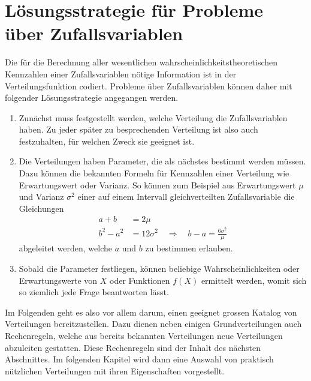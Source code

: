 \section{Lösungsstrategie für Probleme über Zufallsvariablen}
Die für die Berechnung aller wesentlichen wahrscheinlichkeitstheoretischen
Kennzahlen einer Zufallsvariablen nötige Information ist in der
Verteilungsfunktion codiert.
Probleme über Zufallsvariablen können daher mit folgender Lösungsstrategie
angegangen werden.
\begin{enumerate}
\item
Zunächst muss festgestellt werden, welche Verteilung die Zufallsvariablen
haben.
Zu jeder später zu besprechenden Verteilung ist also auch
festzuhalten, für welchen Zweck sie geeignet ist.
\item 
Die Verteilungen haben Parameter, die als nächstes bestimmt werden
müssen.
Dazu können die bekannten Formeln für Kennzahlen einer
Verteilung wie Erwartungswert oder Varianz.
So können zum Beispiel aus Erwartungswert $\mu$ und Varianz $\sigma^2$ 
einer auf einem Intervall gleichverteilten Zufallsvariable  die
Gleichungen
\begin{align*}
a+b&=2\mu\\
b^2-a^2&=12\sigma^2\quad\Rightarrow\quad b-a=\frac{6\sigma^2}{\mu}
\end{align*}
abgeleitet werden, welche $a$ und $b$ zu bestimmen erlauben.
\item
Sobald die Parameter festliegen, können beliebige Wahrscheinlichkeiten
oder Erwartungswerte von $X$ oder Funktionen $f(X)$ ermittelt werden,
womit sich so ziemlich jede Frage beantworten lässt.
\end{enumerate}
Im Folgenden geht es also vor allem darum, einen geeignet grossen
Katalog von Verteilungen bereitzustellen.
Dazu dienen neben einigen
Grundverteilungen auch Rechenregeln, welche aus bereits bekannten
Verteilungen neue Verteilungen abzuleiten gestatten.
Diese Rechenregeln
sind der Inhalt des nächsten Abschnittes.
Im folgenden Kapitel wird
dann eine Auswahl von praktisch nützlichen Verteilungen mit ihren
Eigenschaften vorgestellt.


